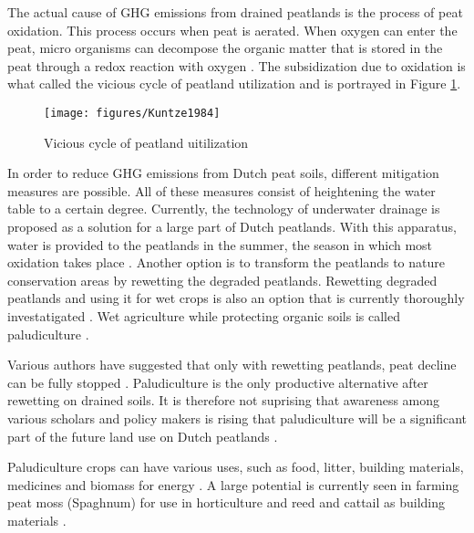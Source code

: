 \documentclass[a4paper,12pt]{scrbook}
\begin{document}
The actual cause of \ac{GHG} emissions from drained peatlands is the process of peat oxidation. This process occurs when peat is aerated. When oxygen can enter the peat, micro organisms can decompose the organic matter that is stored in the peat through a redox reaction with oxygen \citep{erkens2016double}. The subsidization due to oxidation is what \citet{kuntze1984bewirtschaftung} called the vicious cycle of peatland utilization and is portrayed in Figure \ref{fig:peatlanduti}.

\begin{figure}
    \centering
    \texttt{[image: figures/Kuntze1984]} 
    \caption{Vicious cycle of peatland uitilization}
    \label{fig:peatlanduti}
\end{figure}

In order to reduce GHG emissions from Dutch peat soils, different mitigation measures are possible. All of these measures consist of heightening the water table to a certain degree. Currently, the technology of underwater drainage is proposed as a solution for a large part of Dutch peatlands. With this apparatus, water is provided to the peatlands in the summer, the season in which most oxidation takes place \citep{van2011huidige}. Another option is to transform the peatlands to nature conservation areas by rewetting the degraded peatlands. Rewetting degraded peatlands and using it for wet crops is also an option that is currently thoroughly investatigated \citep{Wichmann20151063}. Wet agriculture while protecting organic soils is called paludiculture \citep{joosten2002wise}. 

Various authors have suggested that only with rewetting peatlands, peat decline can be fully stopped \citep{van2016dalende, wichtmann2016paludiculture}. Paludiculture is the only productive alternative after rewetting on drained soils. It is therefore not suprising that awareness among various scholars and policy makers is rising that paludiculture will be a significant part of the future land use on Dutch peatlands \citep{abel2013database, wichtmann2016paludiculture, Wichmann20151063}. 

Paludiculture crops can have various uses, such as food, litter, building materials, medicines and biomass for energy \citep{wichtmann2016paludiculture}. A large potential is currently seen in farming peat moss (Spaghnum) for use in horticulture and reed and cattail as building materials \citep{wichtmann2016paludiculture}.
\end{document}
